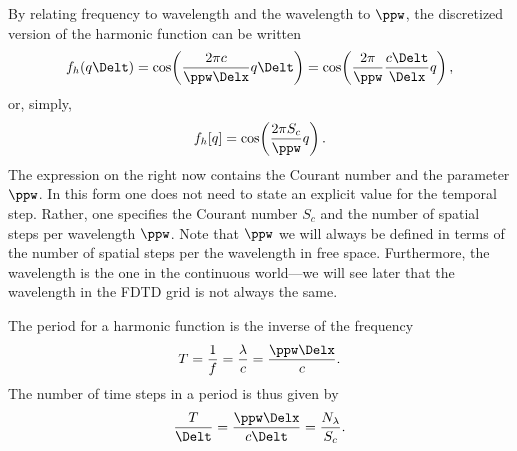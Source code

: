 By relating frequency to wavelength and the wavelength to $\ppw$, the
discretized version of the harmonic function can be written
\begin{equation}
 f_h(q\Delt) = \cos\!\left(\frac{2 \pi c}{\ppw\Delx} q \Delt\right)
           = \cos\!\left(\frac{2 \pi}{\ppw}\frac{c\Delt}{\Delx} q\right),
 \label{eq:fHarmonic}
\end{equation}
or, simply,
\begin{equation}
   f_h[q] = \cos\!\left(\frac{2 \pi S_c}{\ppw} q\right).
 \label{eq:fHarmonicI}
\end{equation}
The expression on the right now contains the Courant number and the
parameter $\ppw$.  In this form one does not need to state an explicit
value for the temporal step.  Rather, one specifies the Courant
number $S_c$ and the number of spatial steps per wavelength $\ppw$.
Note that $\ppw$ we will always be defined in terms of the number of
spatial steps per the wavelength in free space.  Furthermore, the
wavelength is the one in the continuous world---we will see later that
the wavelength in the FDTD grid is not always the same.

The period for a harmonic function is the inverse of the frequency
\begin{equation}
  T = \frac{1}{f} = \frac{\lambda}{c} = \frac{\ppw\Delx}{c}.
\end{equation}
The number of time steps in a period is thus given by
\begin{equation}
  \frac{T}{\Delt} = \frac{\ppw\Delx}{c\Delt} = \frac{N_\lambda}{S_c}.
\end{equation}

